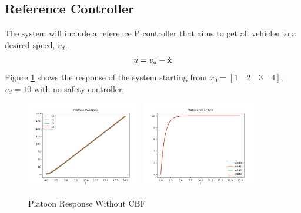 \subsection{Reference Controller}
\noindent The system will include a reference P controller that aims to get all vehicles to a desired speed, $v_d$.
\begin{align} \label{eqn:platoon_reference}
    u = v_d - {\mathbf{\dot{x}}}
\end{align}
\noindent Figure \ref{fig:platoon_no_cbf} shows the response of the system starting from $x_0 = [1 \quad 2 \quad 3 \quad 4]$, $v_d = 10$ with no safety controller.

\begin{figure}[H]
    \centering
    \includegraphics[width=0.45\textwidth]{Figures/Examples/Platoon/NoPositions.png}
    \includegraphics[width=0.45\textwidth]{Figures/Examples/Platoon/NoVelocities.png}
    \caption{Platoon Response Without CBF}
    \label{fig:platoon_no_cbf}
\end{figure}

